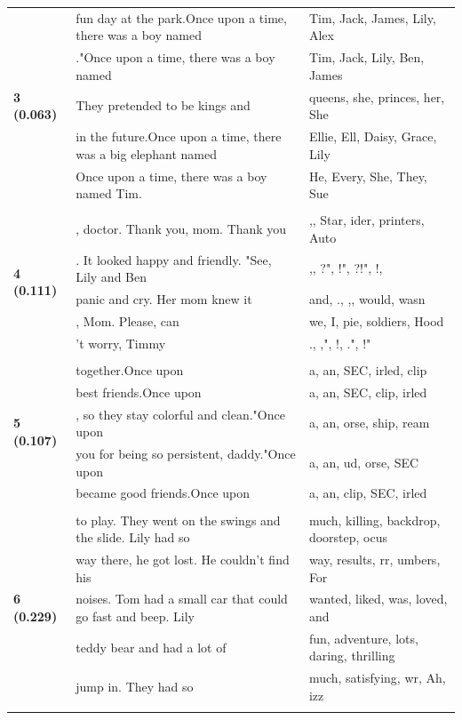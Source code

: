 \documentclass{article}
\theoremstyle{plain}
\theoremstyle{definition}
\theoremstyle{remark}
\begin{document}
\begin{longtable}{|p{}|p{}|p{}|}
\multirow{5}{*}{\textbf{3 (0.063)}} & fun day at the park.Once upon a time, there was a boy named & Tim,  Jack,  James,  Lily,  Alex \\
& ."Once upon a time, there was a boy named & Tim,  Jack,  Lily,  Ben,  James \\
& They pretended to be kings and & queens,  she,  princes,  her,  She \\
& in the future.Once upon a time, there was a big elephant named & Ellie,  Ell,  Daisy,  Grace,  Lily \\
& Once upon a time, there was a boy named Tim. & He,  Every,  She,  They,  Sue \\
& & \\
\multirow{5}{*}{\textbf{4 (0.111)}} & , doctor. Thank you, mom. Thank you & ,,  Star, ider,  printers,  Auto \\
& . It looked happy and friendly.  "See, Lily and Ben & ,, ?", !", ?!", !, \\
& panic and cry. Her mom knew it & and, ., ,,  would,  wasn \\
& , Mom. Please, can & we,  I,  pie,  soldiers,  Hood \\
& 't worry, Timmy & ., ,", !, .", !" \\
& & \\
\multirow{5}{*}{\textbf{5 (0.107)}} & together.Once upon & a,  an, SEC, irled, clip \\
& best friends.Once upon & a,  an, SEC, clip, irled \\
& , so they stay colorful and clean."Once upon & a,  an, orse, ship, ream \\
& you for being so persistent, daddy."Once upon & a,  an, ud, orse, SEC \\
& became good friends.Once upon & a,  an, clip, SEC, irled \\
& & \\
\multirow{5}{*}{\textbf{6 (0.229)}} & to play. They went on the swings and the slide. Lily had so & much,  killing,  backdrop,  doorstep, ocus \\
& way there, he got lost. He couldn't find his & way,  results, rr, umbers, For \\
& noises. Tom had a small car that could go fast and beep. Lily & wanted,  liked,  was,  loved,  and \\
& teddy bear and had a lot of & fun,  adventure,  lots,  daring,  thrilling \\
& jump in. They had so & much,  satisfying, wr, Ah, izz \\
& & \\

\end{longtable}
\end{document}
